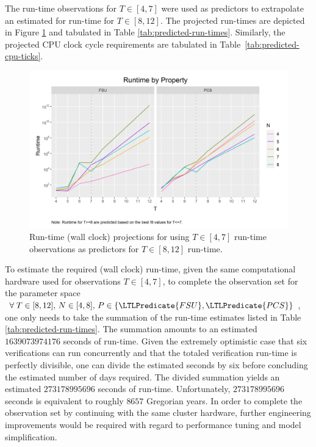 The run-time observations for \(T \in [4, 7]\) were used as predictors to extrapolate an estimated for run-time for \(T \in [8, 12]\).
The projected run-times are depicted in Figure \ref{fig:runtime-projections} and tabulated in Table \ref{tab:predicted-run-times}.
Similarly, the projected CPU clock cycle requirements are tabulated in Table\ \ref{tab:predicted-cpu-ticks}.

\begin{figure}[ht!]
\centering
\caption[Runtime projections for ]{%
\label{fig:runtime-projections}%
Run-time (wall clock) projections for  using $T \in [4, 7]$ run-time observations as predictors for $T \in [8, 12]$ run-time.
}%
\includegraphics[width=\textwidth]{./figures/fsu-pcs-runtime-combined-preidcted.png}
\end{figure}

To estimate the required (wall clock) run-time, given the same computational hardware used for observations \(T \in [4, 7]\), to complete the observation set for the  parameter space \(\forall\; T \in [8, 12],\, N \in [4, 8],\, P \in \{ \LTLPredicate{FSU}, \LTLPredicate{PCS} \}\), one only needs to take the summation of the run-time estimates listed in Table \ref{tab:predicted-run-times}.
The summation amounts to an estimated \(1639073974176\) seconds of run-time.
Given the extremely optimistic case that six verifications can run concurrently and that the totaled verification run-time is perfectly divisible, one can divide the estimated seconds by six before concluding the estimated number of days required.
The divided summation yields an estimated \(273178995696\) seconds of run-time.
Unfortunately, \(273178995696\) seconds is equivalent to roughly \(8657\) Gregorian years.
In order to complete the observation set by continuing with the same cluster hardware, further engineering improvements would be required with regard to performance tuning and model simplification.

